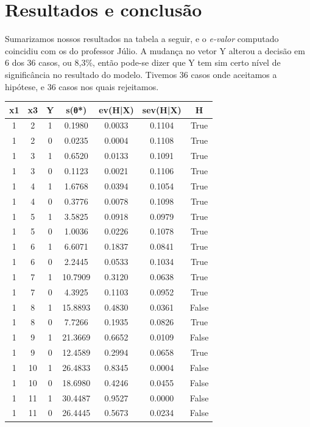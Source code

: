 \documentclass[11pt, a4paper]{article}
\begin{document}
\newpage
\section{Resultados e conclusão}
Sumarizamos nossos resultados na tabela a seguir, e o \textit{e-valor} computado coincidiu com os do professor Júlio. A mudança no vetor Y alterou a decisão em 6 dos 36 casos, ou 8,3\%, então pode-se dizer que Y tem sim certo nível de significância no resultado do modelo. Tivemos 36 casos onde aceitamos a hipótese, e 36 casos nos quais rejeitamos.






\begin{center}
\begin{tabular}{|c|c|c|c|c|c|c|}
\hline
x1 & x3 & Y & s(θ*) & ev(H|X) & sev(H|X) & H \\
\hline
1 & 2 & 1 & 0.1980 & 0.0033 & 0.1104 & True \\
1 & 2 & 0 & 0.0235 & 0.0004 & 0.1108 & True \\
1 & 3 & 1 & 0.6520 & 0.0133 & 0.1091 & True \\
1 & 3 & 0 & 0.1123 & 0.0021 & 0.1106 & True \\
1 & 4 & 1 & 1.6768 & 0.0394 & 0.1054 & True \\
1 & 4 & 0 & 0.3776 & 0.0078 & 0.1098 & True \\
1 & 5 & 1 & 3.5825 & 0.0918 & 0.0979 & True \\
1 & 5 & 0 & 1.0036 & 0.0226 & 0.1078 & True \\
1 & 6 & 1 & 6.6071 & 0.1837 & 0.0841 & True \\
1 & 6 & 0 & 2.2445 & 0.0533 & 0.1034 & True \\
1 & 7 & 1 & 10.7909 & 0.3120 & 0.0638 & True \\
1 & 7 & 0 & 4.3925 & 0.1103 & 0.0952 & True \\
1 & 8 & 1 & 15.8893 & 0.4830 & 0.0361 & False \\
1 & 8 & 0 & 7.7266 & 0.1935 & 0.0826 & True \\
1 & 9 & 1 & 21.3669 & 0.6652 & 0.0109 & False \\
1 & 9 & 0 & 12.4589 & 0.2994 & 0.0658 & True \\
1 & 10 & 1 & 26.4833 & 0.8345 & 0.0004 & False \\
1 & 10 & 0 & 18.6980 & 0.4246 & 0.0455 & False \\
1 & 11 & 1 & 30.4487 & 0.9527 & 0.0000 & False \\
1 & 11 & 0 & 26.4445 & 0.5673 & 0.0234 & False \\

\end{tabular}
\end{center}
\end{document}
